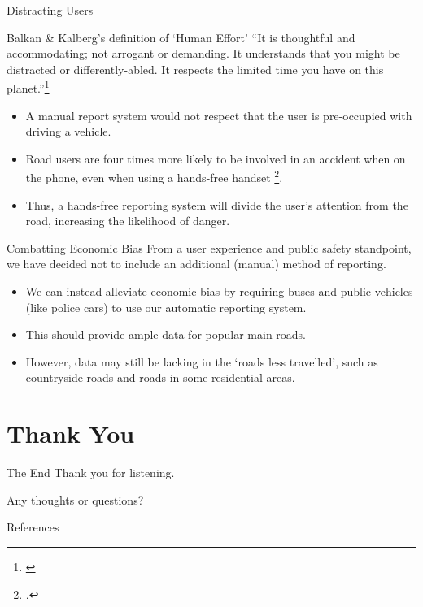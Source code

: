 \documentclass{beamer}
\begin{document}
\begin{frame}{Distracting Users}
    \begin{block}{Balkan \& Kalberg's definition of `Human Effort'}
        ``It is thoughtful and accommodating; not arrogant or demanding. It understands that you might be distracted or differently-abled. It respects the limited time you have on this planet.''\footnote[frame]{\cite{ethical-hierarchy-of-needs}}
    \end{block}

    \begin{itemize}
        \item A manual report system \alert{would not respect that the user is pre-occupied} with driving a vehicle.
        \item Road users are four times more likely to be involved in an accident when on the phone, even when using a hands-free handset \footcite{hands-free-call}.
        \item Thus, a hands-free reporting system will divide the user's attention from the road, increasing the likelihood of danger.
    \end{itemize}
\end{frame}

\begin{frame}{Combatting Economic Bias}
    From a user experience and public safety standpoint, we have decided \alert{not} to include an additional (manual) method of reporting.

    \begin{itemize}
        \item We can instead alleviate economic bias by requiring buses and public vehicles (like police cars) to use our automatic reporting system.
        \item This should provide ample data for popular main roads.
        \item However, data may still be lacking in the `roads less travelled', such as countryside roads and roads in some residential areas.
    \end{itemize}
\end{frame}

\section{Thank You}

\begin{frame}{The End}
    Thank you for listening.
    
    Any thoughts or questions?
\end{frame}

\begin{frame}[allowframebreaks]{References}
    \printbibliography
\end{frame}
\end{document}
